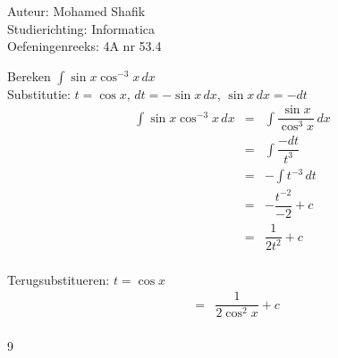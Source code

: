 \documentclass[a4paper]{article}
\begin{document}
\noindent \large Auteur: Mohamed Shafik \\
\noindent \large Studierichting: Informatica\\
\noindent \large Oefeningenreeks: 4A nr 53.4\\

\medskip

\normalsize

Bereken $\displaystyle\int \sin x \cos^{-3} x\, dx$\\

Substitutie: $t = \cos x$, $dt = -\sin x\, dx$, $\sin x\, dx = -dt$\\

\begin{eqnarray*}
\displaystyle\int \sin x \cos^{-3} x\, dx &=& \displaystyle\int \dfrac{\sin x}{\cos^3 x}\, dx\\
&=& \displaystyle\int \dfrac{-dt}{t^3}\\
&=& -\displaystyle\int t^{-3}\, dt\\
&=& -\dfrac{t^{-2}}{-2} + c\\
&=& \dfrac{1}{2t^2} + c\\
\end{eqnarray*}

Terugsubstitueren: $t = \cos x$\\

\begin{eqnarray*}
&=& \dfrac{1}{2\cos^2 x} + c\\
\end{eqnarray*}

\begin{thebibliography}{9}
\end{thebibliography}
\end{document}
